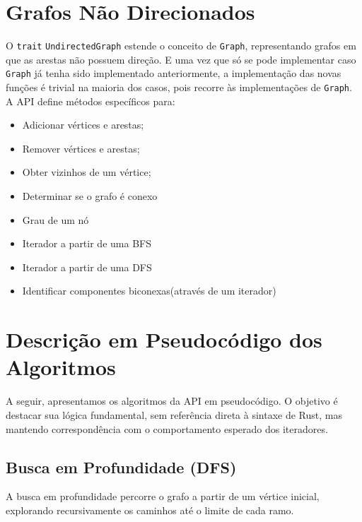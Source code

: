 \section{Grafos Não Direcionados}

O \texttt{trait} \texttt{UndirectedGraph} estende o conceito de
\texttt{Graph}, representando grafos em que as arestas não possuem
direção. E uma vez que só se pode implementar caso \texttt{Graph} já
tenha sido implementado anteriormente, a implementação das novas
funções é trivial na maioria dos casos, pois recorre às
implementações de \texttt{Graph}. A API define métodos específicos para:

\begin{itemize}
  \item Adicionar vértices e arestas;
  \item Remover vértices e arestas;
  \item Obter vizinhos de um vértice;
  \item Determinar se o grafo é conexo
  \item Grau de um nó
  \item Iterador a partir de uma BFS
  \item Iterador a partir de uma DFS
  \item Identificar componentes biconexas(através de um iterador)
\end{itemize}

\section{Descrição em Pseudocódigo dos Algoritmos}

A seguir, apresentamos os algoritmos da API em pseudocódigo. O
objetivo é destacar sua lógica fundamental, sem referência direta à
sintaxe de Rust, mas mantendo correspondência com o comportamento
esperado dos iteradores.

\subsection{Busca em Profundidade (DFS)}

A busca em profundidade percorre o grafo a partir de um vértice
inicial, explorando recursivamente os caminhos até o limite de cada ramo.

